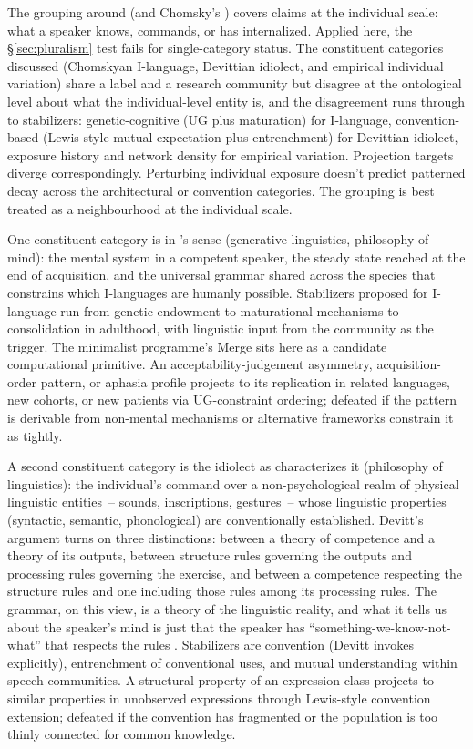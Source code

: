 \documentclass[12pt]{article}
\begin{document}
The grouping around  (and Chomsky's ) covers  claims at the individual scale: what a speaker knows, commands, or has internalized. Applied here, the §\ref{sec:pluralism} test fails for single-category status. The constituent categories discussed (Chomskyan I-language, Devittian idiolect, and empirical individual variation) share a label and a research community but disagree at the ontological level about what the individual-level entity is, and the disagreement runs through to stabilizers: genetic-cognitive (UG plus maturation) for I-language, convention-based (Lewis-style mutual expectation plus entrenchment) for Devittian idiolect, exposure history and network density for empirical variation. Projection targets diverge correspondingly. Perturbing individual exposure doesn't predict patterned decay across the architectural or convention categories. The grouping is best treated as a neighbourhood at the individual scale.

One constituent category is  in \citeauthor{Chomsky1986}'s sense (generative linguistics, philosophy of mind): the mental system in a competent speaker, the steady state reached at the end of acquisition, and the universal grammar shared across the species that constrains which I-languages are humanly possible. Stabilizers proposed for I-language run from genetic endowment to maturational mechanisms to consolidation in adulthood, with linguistic input from the community as the trigger. The minimalist programme's Merge sits here as a candidate computational primitive. An acceptability-judgement asymmetry, acquisition-order pattern, or aphasia profile projects to its replication in related languages, new cohorts, or new patients via UG-constraint ordering; defeated if the pattern is derivable from non-mental mechanisms or alternative frameworks constrain it as tightly.

A second constituent category is the idiolect as \textcite{devitt2008} characterizes it (philosophy of linguistics): the individual's command over a non-psychological realm of physical linguistic entities~-- sounds, inscriptions, gestures~-- whose linguistic properties (syntactic, semantic, phonological) are conventionally established. Devitt's argument turns on three distinctions: between a theory of competence and a theory of its outputs, between structure rules governing the outputs and processing rules governing the exercise, and between a competence respecting the structure rules and one including those rules among its processing rules. The grammar, on this view, is a theory of the linguistic reality, and what it tells us about the speaker's mind is just that the speaker has \enquote{something-we-know-not-what} that respects the rules \citep[219]{devitt2008}. Stabilizers are convention (Devitt invokes \citealt{lewis1969} explicitly), entrenchment of conventional uses, and mutual understanding within speech communities. A structural property of an expression class projects to similar properties in unobserved expressions through Lewis-style convention extension; defeated if the convention has fragmented or the population is too thinly connected for common knowledge.
\end{document}

